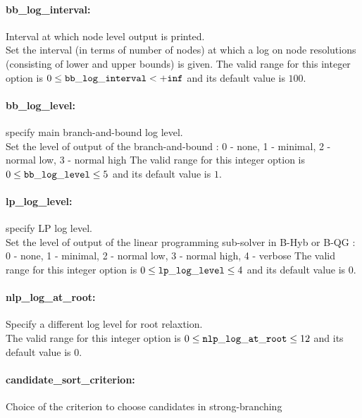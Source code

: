 \paragraph{bb\_log\_interval:}\label{sec:bb_log_interval} Interval at which node level output is printed. $\;$ \\
 Set the interval (in terms of number of nodes) at
which a log on node resolutions (consisting of
lower and upper bounds) is given. The valid range for this integer option is
$0 \le {\tt bb\_log\_interval } <  {\tt +inf}$
and its default value is $100$.


\paragraph{bb\_log\_level:}\label{sec:bb_log_level} specify main branch-and-bound log level. $\;$ \\
 Set the level of output of the branch-and-bound :
0 - none, 1 - minimal, 2 - normal low, 3 - normal
high The valid range for this integer option is
$0 \le {\tt bb\_log\_level } \le 5$
and its default value is $1$.


\paragraph{lp\_log\_level:}\label{sec:lp_log_level} specify LP log level. $\;$ \\
 Set the level of output of the linear programming
sub-solver in B-Hyb or B-QG : 0 - none, 1 -
minimal, 2 - normal low, 3 - normal high, 4 -
verbose The valid range for this integer option is
$0 \le {\tt lp\_log\_level } \le 4$
and its default value is $0$.


\paragraph{nlp\_log\_at\_root:}\label{sec:nlp_log_at_root}  Specify a different log level for root relaxtion. $\;$ \\
 The valid range for this integer option is
$0 \le {\tt nlp\_log\_at\_root } \le 12$
and its default value is $0$.


\paragraph{candidate\_sort\_criterion:}\label{sec:candidate_sort_criterion} Choice of the criterion to choose candidates in strong-branching $\;$ \\

